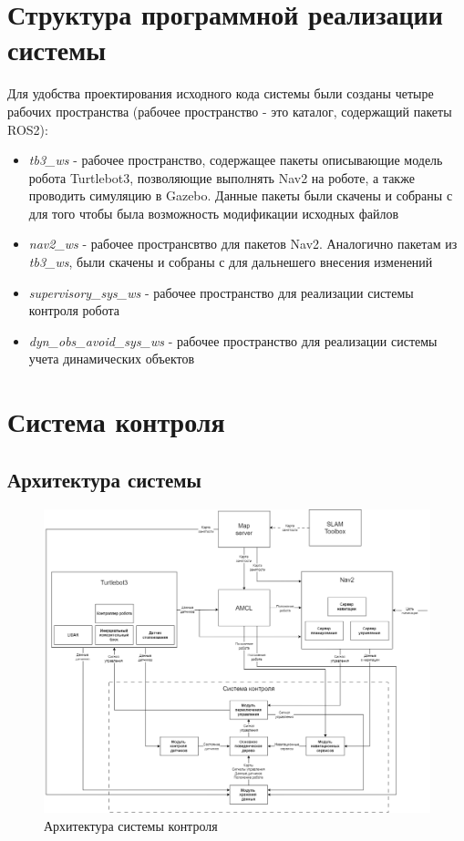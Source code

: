 \section{Структура программной реализации системы}

Для удобства проектирования исходного кода системы были созданы четыре рабочих пространства (рабочее пространство - это каталог, содержащий пакеты ROS2):
\begin{itemize}
    \item \textit{tb3\_ws} - рабочее пространство, содержащее пакеты описывающие модель робота Turtlebot3, позволяющие выполнять Nav2 на роботе, а также проводить симуляцию в Gazebo. Данные пакеты были скачены и собраны с \cite{tb3-git} для того чтобы была возможность модификации исходных файлов
    \item \textit{nav2\_ws} - рабочее пространсвтво для пакетов Nav2. Аналогично пакетам из \textit{tb3\_ws}, были скачены и собраны с \cite{nav2-git} для дальнешего внесения изменений 
    \item \textit{supervisory\_sys\_ws} - рабочее пространство для реализации системы контроля робота
    \item \textit{dyn\_obs\_avoid\_sys\_ws} - рабочее пространство для реализации системы учета динамических объектов
\end{itemize}

\section{Система контроля}

\subsection{Архитектура системы}

\begin{figure}[h]
    \centering
    \includegraphics[width=1.0\textwidth]{images/chap_3/supervisory_system.png}
    \caption{Архитектура системы контроля}
    \label{fig:supervisory_system}
\end{figure}

